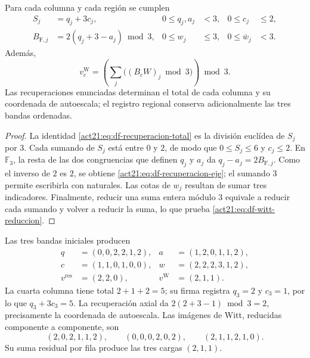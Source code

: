 \begin{theorem}
\label{act21:thm:df-recuperacion-firma}
Para cada columna y cada región se cumplen
\begin{align}
 S_j&=q_j+3c_j,&0\leq q_j,a_j&<3,&0\leq c_j&\leq2,
 \label{act21:eq:df-recuperacion-total}\\
 B_{\mathrm F,j}&=2(q_j+3-a_j)\bmod3,&0\leq w_j&\leq3,
 &0\leq\bar w_j&<3.
 \label{act21:eq:df-recuperacion-eje}
\end{align}
Además,
\begin{equation}
 v_c^{\mathrm W}
 =\left(\sum_j\bigl((B_cW)_j\bmod3\bigr)\right)\bmod3.
 \label{act21:eq:df-witt-reduccion}
\end{equation}
Las recuperaciones enunciadas determinan el total de cada columna y su
coordenada de autoescala; el registro regional conserva adicionalmente
las tres bandas ordenadas.
\end{theorem}

\begin{proof}
La identidad \eqref{act21:eq:df-recuperacion-total} es la división euclídea de
\(S_j\) por \(3\). Cada sumando de \(S_j\) está entre \(0\) y \(2\),
de modo que \(0\leq S_j\leq6\) y \(c_j\leq2\). En \(\mathbb F_3\),
la resta de las dos congruencias que definen \(q_j\) y \(a_j\) da
\(q_j-a_j=2B_{\mathrm F,j}\). Como el inverso de \(2\) es \(2\), se
obtiene \eqref{act21:eq:df-recuperacion-eje}; el sumando \(3\) permite
escribirla con naturales. Las cotas de \(w_j\) resultan de sumar tres
indicadores. Finalmente, reducir una suma entera módulo \(3\) equivale
a reducir cada sumando y volver a reducir la suma, lo que prueba
\eqref{act21:eq:df-witt-reduccion}.
\end{proof}

\begin{example}
Las tres bandas iniciales producen
\begin{align*}
 q&=(0,0,2,2,1,2),&a&=(1,2,0,1,1,2),\\
 c&=(1,1,0,1,0,0),&w&=(2,2,2,3,1,2),\\
 v^{\mathrm{res}}&=(2,2,0),&v^{\mathrm W}&=(2,1,1).
\end{align*}
La cuarta columna tiene total \(2+1+2=5\); su firma registra
\(q_3=2\) y \(c_3=1\), por lo que \(q_3+3c_3=5\).
La recuperación axial da
\(2(2+3-1)\bmod3=2\), precisamente la coordenada de autoescala.
Las imágenes de Witt, reducidas componente a componente, son
\[
 (2,0,2,1,1,2),\qquad
 (0,0,0,2,0,2),\qquad
 (2,1,1,2,1,0).
\]
Su suma residual por fila produce las tres cargas \((2,1,1)\).
\end{example}

